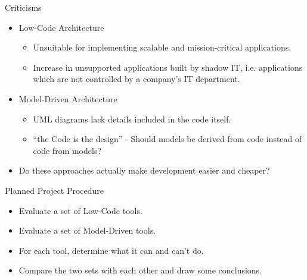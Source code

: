 \documentclass[aspectratio=169]{beamer}
\begin{document}
  \begin{frame}{Criticisms}
    \begin{itemize}
      \item Low-Code Architecture
        \begin{itemize}
          \item Unsuitable for implementing scalable and mission-critical applications.
          \item Increase in unsupported applications built by shadow IT,
                i.e. applications which are not controlled by a company's IT department.
        \end{itemize}
      \item Model-Driven Architecture
        \begin{itemize}
          \item UML diagrams lack details included in the code itself.
          \item “the Code is the design” - Should models be derived from code instead of code from models?
        \end{itemize}
      \item Do these approaches actually make development easier and cheaper?
    \end{itemize}
  \end{frame}

  \begin{frame}{Planned Project Procedure}
    \begin{itemize}
      \item Evaluate a set of Low-Code tools.
      \item Evaluate a set of Model-Driven tools.
      \item For each tool, determine what it can and can't do.
      \item Compare the two sets with each other and draw some conclusions.
    \end{itemize}
  \end{frame}
\end{document}
